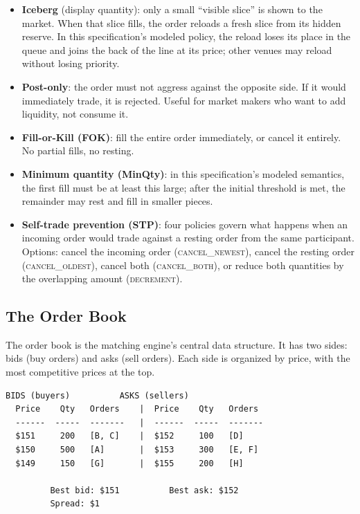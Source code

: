 \documentclass[11pt,a4paper]{article}
\begin{document}
\begin{itemize}[nosep]
\item \textbf{Iceberg} (display quantity): only a small ``visible
      slice'' is shown to the market. When that slice fills, the order
      reloads a fresh slice from its hidden reserve. In this
      specification's modeled policy, the reload loses its place in the
      queue and joins the back of the line at its price; other venues
      may reload without losing priority.

\item \textbf{Post-only}: the order must not aggress against the
      opposite side. If it would immediately trade, it is rejected.
      Useful for market makers who want to add liquidity, not consume
      it.

\item \textbf{Fill-or-Kill (FOK)}: fill the entire order immediately,
      or cancel it entirely. No partial fills, no resting.

\item \textbf{Minimum quantity (MinQty)}: in this specification's
      modeled semantics, the first fill must be at least this large;
      after the initial threshold is met, the remainder may rest and
      fill in smaller pieces.

\item \textbf{Self-trade prevention (STP)}: four policies govern what
      happens when an incoming order would trade against a resting order
      from the same participant. Options: cancel the incoming order
      (\textsc{cancel\_newest}), cancel the resting order
      (\textsc{cancel\_oldest}), cancel both
      (\textsc{cancel\_both}), or reduce both quantities by the
      overlapping amount (\textsc{decrement}).
\end{itemize}

\subsection{The Order Book}
\label{sec:book-intro}

The order book is the matching engine's central data structure. It has
two sides: bids (buy orders) and asks (sell orders). Each side is
organized by price, with the most competitive prices at the top.

\begin{center}
\begin{lstlisting}[language={},basicstyle=\ttfamily\footnotesize,frame=single,xleftmargin=0pt,framexleftmargin=0pt]
         BIDS (buyers)          ASKS (sellers)
  Price    Qty   Orders    |  Price    Qty   Orders
  ------  -----  -------   |  ------  -----  -------
  $151     200   [B, C]    |  $152     100   [D]
  $150     500   [A]       |  $153     300   [E, F]
  $149     150   [G]       |  $155     200   [H]

         Best bid: $151          Best ask: $152
         Spread: $1
\end{lstlisting}
\end{center}
\end{document}

